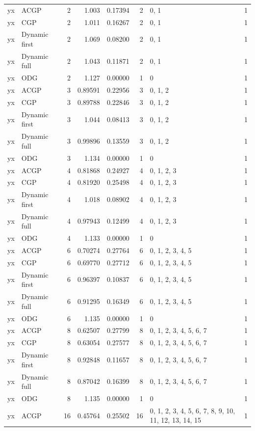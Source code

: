 \documentclass[10pt,a4paper]{article}
\begin{document}
\begin{longtable}{@{}p{23mm}p{29mm}rrrrp{36mm}r@{}}
yx & ACGP & 2 & 1.003 & 0.17394 & 2 & 0, 1 & 1 \\
yx & CGP & 2 & 1.011 & 0.16267 & 2 & 0, 1 & 1 \\
yx & Dynamic first & 2 & 1.069 & 0.08200 & 2 & 0, 1 & 1 \\
yx & Dynamic full & 2 & 1.043 & 0.11871 & 2 & 0, 1 & 1 \\
yx & ODG & 2 & 1.127 & 0.00000 & 1 & 0 & 1 \\
yx & ACGP & 3 & 0.89591 & 0.22956 & 3 & 0, 1, 2 & 1 \\
yx & CGP & 3 & 0.89788 & 0.22846 & 3 & 0, 1, 2 & 1 \\
yx & Dynamic first & 3 & 1.044 & 0.08413 & 3 & 0, 1, 2 & 1 \\
yx & Dynamic full & 3 & 0.99896 & 0.13559 & 3 & 0, 1, 2 & 1 \\
yx & ODG & 3 & 1.134 & 0.00000 & 1 & 0 & 1 \\
yx & ACGP & 4 & 0.81868 & 0.24927 & 4 & 0, 1, 2, 3 & 1 \\
yx & CGP & 4 & 0.81920 & 0.25498 & 4 & 0, 1, 2, 3 & 1 \\
yx & Dynamic first & 4 & 1.018 & 0.08902 & 4 & 0, 1, 2, 3 & 1 \\
yx & Dynamic full & 4 & 0.97943 & 0.12499 & 4 & 0, 1, 2, 3 & 1 \\
yx & ODG & 4 & 1.133 & 0.00000 & 1 & 0 & 1 \\
yx & ACGP & 6 & 0.70274 & 0.27764 & 6 & 0, 1, 2, 3, 4, 5 & 1 \\
yx & CGP & 6 & 0.69770 & 0.27712 & 6 & 0, 1, 2, 3, 4, 5 & 1 \\
yx & Dynamic first & 6 & 0.96397 & 0.10837 & 6 & 0, 1, 2, 3, 4, 5 & 1 \\
yx & Dynamic full & 6 & 0.91295 & 0.16349 & 6 & 0, 1, 2, 3, 4, 5 & 1 \\
yx & ODG & 6 & 1.135 & 0.00000 & 1 & 0 & 1 \\
yx & ACGP & 8 & 0.62507 & 0.27799 & 8 & 0, 1, 2, 3, 4, 5, 6, 7 & 1 \\
yx & CGP & 8 & 0.63054 & 0.27577 & 8 & 0, 1, 2, 3, 4, 5, 6, 7 & 1 \\
yx & Dynamic first & 8 & 0.92848 & 0.11657 & 8 & 0, 1, 2, 3, 4, 5, 6, 7 & 1 \\
yx & Dynamic full & 8 & 0.87042 & 0.16399 & 8 & 0, 1, 2, 3, 4, 5, 6, 7 & 1 \\
yx & ODG & 8 & 1.135 & 0.00000 & 1 & 0 & 1 \\
yx & ACGP & 16 & 0.45764 & 0.25502 & 16 & 0, 1, 2, 3, 4, 5, 6, 7, 8, 9, 10, 11, 12, 13, 14, 15 & 1 \\

\end{longtable}
\end{document}
